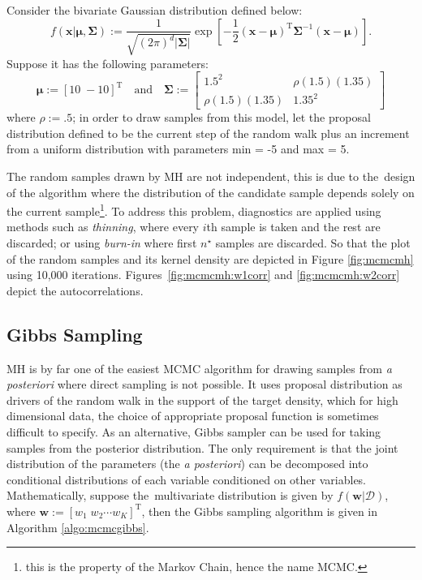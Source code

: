 \begin{exmp}\label{exmp:mcmcmh}
Consider the bivariate Gaussian distribution defined below:
\begin{equation}
f(\mathbf{x}|\boldsymbol{\mu},\boldsymbol{\Sigma})
:=\frac{1}{\sqrt{(2\pi)^d|\boldsymbol{\Sigma}|}}\exp\left[-\frac{1}{2}(\mathbf{x} - \boldsymbol{\mu})^{\text{T}}\boldsymbol{\Sigma}^{-1}(\mathbf{x}-\boldsymbol{\mu})\right].
\end{equation}
Suppose it has the following parameters: 
\begin{equation}\nonumber
\boldsymbol{\mu}:=[10\;-10]^{\text{T}} \quad\text{and}\quad \boldsymbol{\Sigma}:=\left[\begin{array}{cc}1.5^2&\rho(1.5)(1.35)\\\rho(1.5)(1.35)&1.35^2\end{array}\right]
\end{equation}
where ${\rho := .5}$; in order to draw samples from this model, let the proposal distribution defined to be the current step of the random walk plus an increment from a uniform distribution with parameters min = -5 and max = 5.

The random samples drawn by MH are not independent, this is due to \mbox{the design} of the algorithm where the distribution of the candidate sample depends solely on the current sample\footnote{this is the property of the Markov Chain, hence the name MCMC.}. To address this problem, diagnostics are applied using methods such as \textit{thinning}, where every $i$th sample is taken and the rest are discarded; or using \textit{burn-in} where first $n^{\star}$ samples are discarded. So that the plot of the random samples and its kernel density are depicted in Figure \ref{fig:mcmcmh} using 10,000 iterations. \mbox{Figures \ref{fig:mcmcmh:w1corr}} and \ref{fig:mcmcmh:w2corr} depict the autocorrelations.

\end{exmp}
\subsection{Gibbs Sampling}\label{sec:gibbssampling}
MH is by far one of the easiest MCMC algorithm for drawing samples from \textit{a posteriori} where direct sampling is not possible. It uses proposal distribution as drivers of the random walk in the support of the target density, which for high dimensional data, the choice of appropriate proposal function is sometimes difficult to specify. As an alternative, Gibbs sampler can be used for taking samples from the posterior distribution. The only requirement is that the joint distribution of the parameters (the \textit{a posteriori}) can be decomposed into conditional distributions of each variable conditioned on other variables. Mathematically, suppose \mbox{the multivariate} distribution is given by $f(\mathbf{w}|\mathscr{D})$, where $\mathbf{w}:=[w_1\;w_2\cdots w_K]^{\text{T}}$, then the Gibbs sampling algorithm is given in Algorithm \ref{algo:mcmcgibbs}.
\vspace{.4cm}

